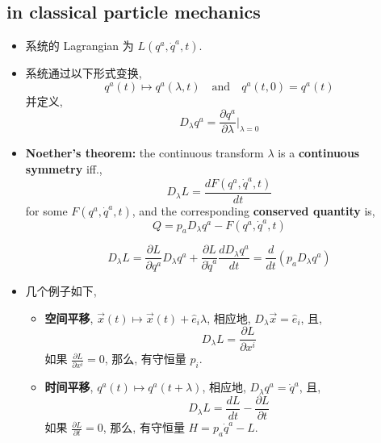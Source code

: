 \subsection{in classical particle mechanics}
\begin{itemize}
	\item 系统的 Lagrangian 为 $L(q^a, \dot{q}^a, t)$.
	
	\item 系统通过以下形式变换,
	\begin{equation}
		q^a(t) \mapsto q^a(\lambda, t) \quad \text{and} \quad q^a(t, 0) = q^a(t)
	\end{equation}
	并定义,
	\begin{equation}
		D_\lambda q^a = \frac{\partial q^a}{\partial \lambda} \Big|_{\lambda = 0}
	\end{equation}
	
	\item \textbf{Noether's theorem:} the continuous transform $\lambda$ is a \textbf{continuous symmetry} iff.,
	\begin{equation}
		D_\lambda L = \frac{d F(q^a, \dot{q}^a, t)}{dt}
	\end{equation}
	for some $F(q^a, \dot{q}^a, t)$, and the corresponding \textbf{conserved quantity} is,
	\begin{equation}
		Q = p_a D_\lambda q^a - F(q^a, \dot{q}^a, t)
	\end{equation}
	
	\begin{tcolorbox}[title=proof:]
		\begin{equation}
			D_\lambda L = \frac{\partial L}{\partial q^a} D_\lambda q^a + \frac{\partial L}{\partial \dot{q}^a} \frac{d D_\lambda q^a}{dt} = \frac{d}{dt} (p_a D_\lambda q^a)
		\end{equation}
	\end{tcolorbox}
	
	\item 几个例子如下,
	\begin{itemize}
		\item \textbf{空间平移}, $\vec{x}(t) \mapsto \vec{x}(t) + \hat{e}_i \lambda$, 相应地, $D_\lambda \vec{x} = \hat{e}_i$, 且,
		\begin{equation}
			D_\lambda L = \frac{\partial L}{\partial x^i}
		\end{equation}
		如果 $\frac{\partial L}{\partial x^i} = 0$, 那么, 有守恒量 $p_i$.
		
		\item \textbf{时间平移}, $q^a(t) \mapsto q^a(t + \lambda)$, 相应地, $D_\lambda q^a = \dot{q}^a$, 且,
		\begin{equation}
			D_\lambda L = \frac{d L}{dt} - \frac{\partial L}{\partial t}
		\end{equation}
		如果 $\frac{\partial L}{\partial t} = 0$, 那么, 有守恒量 $H = p_a \dot{q}^a - L$.
		

\end{itemize}
\end{itemize}
